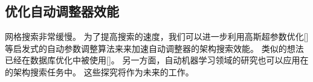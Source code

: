 \subsection{优化自动调整器效能}
网格搜索非常缓慢。
为了提高搜索的速度，我们可以进一步利用高斯超参数优化[]等启发式的自动参数调整算法来来加速自动调整器的架构搜索效能。
类似的想法已经在数据库优化中被使用[]。
另一方面，自动机器学习领域的研究也可以应用在{\rmi}的架构搜索任务中。
这些探究将作为未来的工作。

